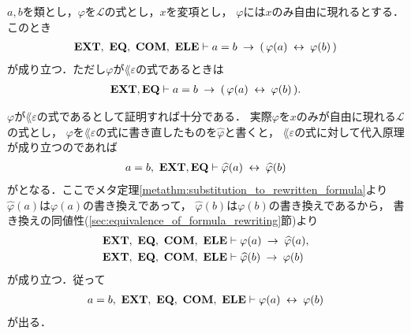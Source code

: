 	\begin{screen}
		\begin{thm}[代入原理]\label{thm:the_principle_of_substitution}
			$a,b$を類とし，$\varphi$を$\mathcal{L}$の式とし，$x$を変項とし，
			$\varphi$には$x$のみ自由に現れるとする．このとき
			\begin{align}
				\mbox{{\bf EXT}},\ \mbox{{\bf EQ}},\ \mbox{\bf COM},\ \mbox{{\bf ELE}} \vdash a = b \hspace{0.25em}\rightarrow\hspace{0.25em} 
				(\, \varphi(a) \hspace{0.25em}\leftrightarrow\hspace{0.25em} \varphi(b)\, )
			\end{align}
			が成り立つ．ただし$\varphi$が$\lang{\varepsilon}$の式であるときは
			\begin{align}
				\mbox{{\bf EXT}},\mbox{{\bf EQ}} \vdash a = b \hspace{0.25em}\rightarrow\hspace{0.25em} 
				(\, \varphi(a) \hspace{0.25em}\leftrightarrow\hspace{0.25em} \varphi(b)\, ).
			\end{align}
		\end{thm}
	\end{screen}
	
	$\varphi$が$\lang{\varepsilon}$の式であるとして証明すれば十分である．
	実際$\varphi$を$x$のみが自由に現れる$\mathcal{L}$の式とし，
	$\varphi$を$\lang{\varepsilon}$の式に書き直したものを$\widehat{\varphi}$と書くと，
	$\lang{\varepsilon}$の式に対して代入原理が成り立つのであれば
	\begin{align}
		a = b,\ \mbox{{\bf EXT}},\mbox{{\bf EQ}} \vdash \widehat{\varphi}(a) \hspace{0.25em}\leftrightarrow\hspace{0.25em} \widehat{\varphi}(b)
	\end{align}
	がとなる．ここでメタ定理\ref{metathm:substitution_to_rewritten_formula}より
	$\widehat{\varphi}(a)$は$\varphi(a)$の書き換えであって，
	$\widehat{\varphi}(b)$は$\varphi(b)$の書き換えであるから，
	書き換えの同値性(\ref{sec:equivalence_of_formula_rewriting}節)より
	\begin{align}
		\mbox{{\bf EXT}},\ \mbox{{\bf EQ}},\ \mbox{\bf COM},\ \mbox{{\bf ELE}} &\vdash \varphi(a) \hspace{0.25em}\rightarrow\hspace{0.25em} \widehat{\varphi}(a), \\
		\mbox{{\bf EXT}},\ \mbox{{\bf EQ}},\ \mbox{\bf COM},\ \mbox{{\bf ELE}} &\vdash \widehat{\varphi}(b) \hspace{0.25em}\rightarrow\hspace{0.25em} \varphi(b)
	\end{align}
	が成り立つ．従って
	\begin{align}
		a = b,\ \mbox{{\bf EXT}},\ \mbox{{\bf EQ}},\ \mbox{\bf COM},\ \mbox{{\bf ELE}} \vdash \varphi(a) \hspace{0.25em}\leftrightarrow\hspace{0.25em} \varphi(b)
	\end{align}
	が出る．
	
